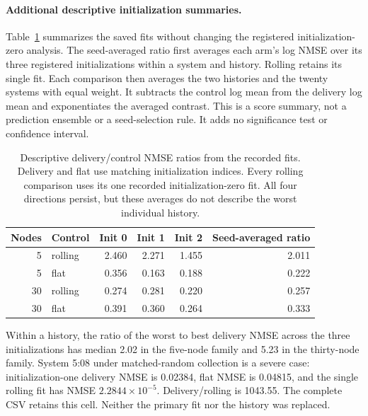 \clearpage
\paragraph{Additional descriptive initialization summaries.}
Table~\ref{tab:initialization-contrasts} summarizes the saved fits without
changing the registered initialization-zero analysis. The seed-averaged ratio
first averages each arm's log NMSE over its three registered initializations
within a system and history. Rolling retains its single fit. Each comparison
then averages the two histories and the twenty systems with equal weight.
It subtracts the control log mean from the delivery log mean and exponentiates
the averaged contrast. This is a score summary, not a prediction ensemble or a
seed-selection rule. It adds no significance test or confidence interval.

\begin{table}[ht]
\centering\small
\begin{tabular}{rlrrrr}
\toprule
Nodes & Control & Init 0 & Init 1 & Init 2 & Seed-averaged ratio\\
\midrule
5 & rolling & 2.460 & 2.271 & 1.455 & 2.011\\
5 & flat & 0.356 & 0.163 & 0.188 & 0.222\\
30 & rolling & 0.274 & 0.281 & 0.220 & 0.257\\
30 & flat & 0.391 & 0.360 & 0.264 & 0.333\\
\bottomrule
\end{tabular}
\caption{Descriptive delivery/control NMSE ratios from the recorded fits.
Delivery and flat use matching initialization indices. Every rolling comparison
uses its one recorded initialization-zero fit. All four directions persist,
but these averages do not describe the worst individual history.}
\label{tab:initialization-contrasts}
\end{table}

Within a history, the ratio of the worst to best delivery NMSE across the three
initializations has median 2.02 in the five-node family and 5.23 in the thirty-node
family. System 5:08 under matched-random collection is a severe case:
initialization-one delivery NMSE is 0.02384, flat NMSE is 0.04815, and the
single rolling fit has NMSE $2.2844\times10^{-5}$. Delivery/rolling is 1043.55.
The complete CSV retains this cell. Neither the primary fit nor the history
was replaced.

